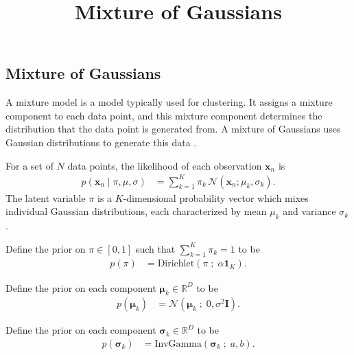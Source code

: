 \title{Mixture of Gaussians}

\subsection{Mixture of Gaussians}

A mixture model is a model typically used for clustering.
It assigns a mixture component to each data point, and this mixture component
determines the distribution that the data point is generated from. A
mixture of Gaussians uses Gaussian distributions to generate this data
\citep{bishop2006pattern}.

For a set of $N$ data points,
the likelihood of each observation $\mathbf{x}_n$ is
\begin{align*}
  p(\mathbf{x}_n \mid \pi, \mu, \sigma)
  &=
  \sum_{k=1}^K \pi_k \, \mathcal{N}(\mathbf{x}_n ; \mu_k, \sigma_k).
\end{align*}
The latent variable $\pi$ is a $K$-dimensional probability vector
which mixes individual Gaussian distributions, each
characterized by mean $\mu_k$ and variance $\sigma_k$.

Define the prior on $\pi\in[0,1]$ such that $\sum_{k=1}^K\pi_k=1$ to be
\begin{align*}
  p(\pi)
  &=
  \text{Dirichlet}(\pi \;;\; \alpha \mathbf{1}_{K}).
\end{align*}

Define the prior on each component $\mathbf{\mu}_k\in\mathbb{R}^D$ to be
\begin{align*}
  p(\mathbf{\mu}_k)
  &=
  \mathcal{N}(\mathbf{\mu}_k \;;\; 0, \sigma^2\mathbf{I}).
\end{align*}

Define the prior on each component $\mathbf{\sigma}_k\in\mathbb{R}^D$ to be
\begin{align*}
  p(\mathbf{\sigma}_k)
  &=
  \text{InvGamma}(\mathbf{\sigma}_k \;;\; a, b).
\end{align*}

